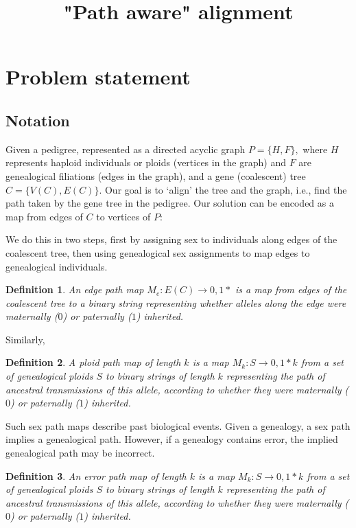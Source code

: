 \documentclass[14pt]{extarticle}
\newtheorem{definition}{Definition}
\begin{document}
	
	
\title{"Path aware" alignment}
\date{}


\section{Problem statement}

\subsection{Notation}

Given a pedigree, represented as a directed acyclic graph $P = \{H, F\},$ where $H$ represents haploid individuals or ploids (vertices in the graph) and $F$ are genealogical filiations (edges in the graph), and a gene (coalescent) tree $C = \{V(C), E(C)\}.$ Our goal is to `align' the tree and the graph, i.e., find the path taken by the gene tree in the pedigree. Our solution can be encoded as a map from edges of $C$ to vertices of $P$:

We do this in two steps, first by assigning sex to individuals along edges of the coalescent tree, then using genealogical sex assignments to map edges to genealogical individuals.  

\begin{definition}
An edge path map $M_e:E(C) \rightarrow {0,1}*$ is a map from edges of the coalescent tree to a binary string representing whether alleles along the edge were maternally ($0$) or paternally ($1$) inherited.     
\end{definition}

Similarly, 
\begin{definition}
A ploid path map of length $k$ is a map $M_k:S \rightarrow {0,1}*k$ from a set of genealogical ploids $S$ to binary strings of length $k$ representing the path of ancestral transmissions of this allele, according to whether they were maternally ($0$) or paternally ($1$) inherited.      
\end{definition}

Such sex path maps describe past biological events. Given a genealogy, a sex path implies a genealogical path. However, if a genealogy contains error, the implied genealogical path may be incorrect. 

\begin{definition}
An error path map of length $k$ is a map $M_k:S \rightarrow {0,1}*k$ from a set of genealogical ploids $S$ to binary strings of length $k$ representing the path of ancestral transmissions of this allele, according to whether they were maternally ($0$) or paternally ($1$) inherited.      
\end{definition}
\end{document}

